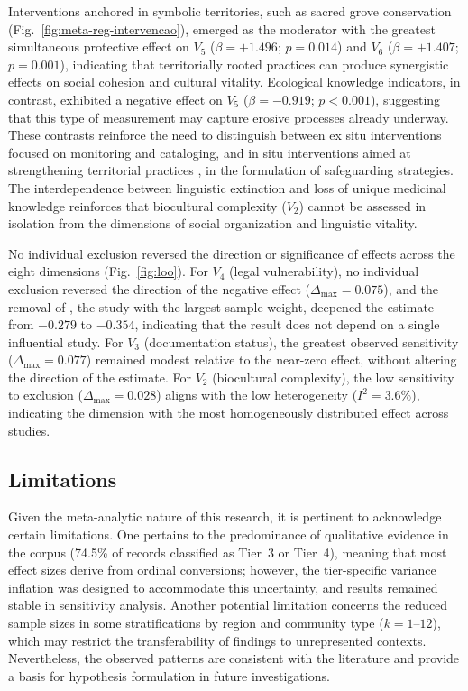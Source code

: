 \documentclass[12pt,a4paper]{article}
\begin{document}
Interventions anchored in symbolic territories, such as sacred grove conservation (Fig.~\ref{fig:meta-reg-intervencao}), emerged as the moderator with the greatest simultaneous protective effect on $V_5$ ($\beta = +1.496$; $p = 0.014$) and $V_6$ ($\beta = +1.407$; $p = 0.001$), indicating that territorially rooted practices can produce synergistic effects on social cohesion and cultural vitality. Ecological knowledge indicators, in contrast, exhibited a negative effect on $V_5$ ($\beta = -0.919$; $p < 0.001$), suggesting that this type of measurement may capture erosive processes already underway. These contrasts reinforce the need to distinguish between ex situ interventions focused on monitoring and cataloging, and in situ interventions aimed at strengthening territorial practices \citep{Zimmerer2018}, in the formulation of safeguarding strategies. The interdependence between linguistic extinction and loss of unique medicinal knowledge \citep{CamaraLeret2021} reinforces that biocultural complexity ($V_2$) cannot be assessed in isolation from the dimensions of social organization and linguistic vitality.

No individual exclusion reversed the direction or significance of effects across the eight dimensions (Fig.~\ref{fig:loo}). For $V_4$ (legal vulnerability), no individual exclusion reversed the direction of the negative effect ($\Delta_{\max} = 0.075$), and the removal of \citet{Sibanda2025}, the study with the largest sample weight, deepened the estimate from $-0.279$ to $-0.354$, indicating that the result does not depend on a single influential study. For $V_3$ (documentation status), the greatest observed sensitivity ($\Delta_{\max} = 0.077$) remained modest relative to the near-zero effect, without altering the direction of the estimate. For $V_2$ (biocultural complexity), the low sensitivity to exclusion ($\Delta_{\max} = 0.028$) aligns with the low heterogeneity ($I^2 = 3.6\%$), indicating the dimension with the most homogeneously distributed effect across studies.

\subsection{Limitations}
\label{sec:limitations}

Given the meta-analytic nature of this research, it is pertinent to acknowledge certain limitations. One pertains to the predominance of qualitative evidence in the corpus (74.5\% of records classified as Tier~3 or Tier~4), meaning that most effect sizes derive from ordinal conversions; however, the tier-specific variance inflation was designed to accommodate this uncertainty, and results remained stable in sensitivity analysis. Another potential limitation concerns the reduced sample sizes in some stratifications by region and community type ($k = 1$--$12$), which may restrict the transferability of findings to unrepresented contexts. Nevertheless, the observed patterns are consistent with the literature and provide a basis for hypothesis formulation in future investigations.
\end{document}
